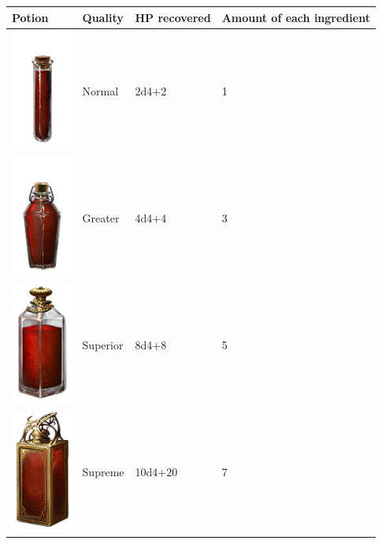 \begin{tabular}{m{2cm}m{3cm}m{4cm}m{4cm} } \hline
	\textbf{Potion} & \textbf{Quality} & \textbf{HP recovered} & \textbf{Amount of each ingredient} \\ \hline
	\includegraphics[width=2cm]{../Pictures/Gameplay/Items/Consumables/Potions/Normal_healing_potion_picture.png} & Normal & 2d4+2  & 1  \\ \hline
	\includegraphics[width=2cm]{../Pictures/Gameplay/Items/Consumables/Potions/Greater_healing_potion_picture.png} & Greater & 4d4+4 & 3 \\ \hline
	\includegraphics[width=2cm]{../Pictures/Gameplay/Items/Consumables/Potions/Superior_healing_potion_picture.png} & Superior & 8d4+8 & 5 \\ \hline
	\includegraphics[width=2cm]{../Pictures/Gameplay/Items/Consumables/Potions/Supreme_healing_potion_picture.png} & Supreme & 10d4+20 & 7 \\ \hline
\end{tabular}

\clearpage